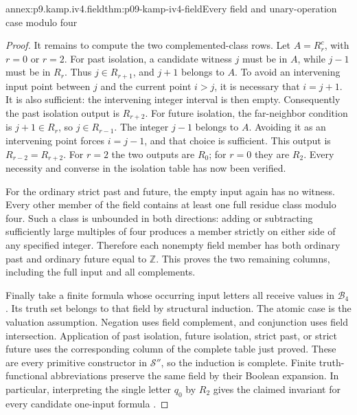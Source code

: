 \begin{annexitem}{annex:p9.kamp.iv4.field}{thm:p09-kamp-iv4-field}{Every field and unary-operation case modulo four}
\begin{proof}
It remains to compute the two complemented-class rows.
Let \(A=R_r^c\), with \(r=0\) or \(r=2\).
For past isolation, a candidate witness \(j\) must be
in \(A\), while \(j-1\) must be in \(R_r\).
Thus \(j\in R_{r+1}\), and \(j+1\) belongs to
\(A\). To avoid an intervening input point between
\(j\) and the current point \(i>j\), it is necessary
that \(i=j+1\). It is also sufficient: the intervening
integer interval is then empty. Consequently the past
isolation output is \(R_{r+2}\). For future isolation,
the far-neighbor condition is \(j+1\in R_r\), so
\(j\in R_{r-1}\). The integer \(j-1\) belongs
to \(A\). Avoiding it as an intervening point forces
\(i=j-1\), and that choice is sufficient. This output
is \(R_{r-2}=R_{r+2}\). For \(r=2\) the two
outputs are \(R_0\); for \(r=0\) they are
\(R_2\). Every necessity and converse in the isolation
table has now been verified.

For the ordinary strict past and future, the empty input
again has no witness. Every other member of the field
contains at least one full residue class modulo four.
Such a class is unbounded in both directions: adding or
subtracting sufficiently large multiples of four produces
a member strictly on either side of any specified integer.
Therefore each nonempty field member has both ordinary
past and ordinary future equal to \(\mathbb Z\).
This proves the two remaining columns, including the full
input and all complements.

Finally take a finite formula whose occurring input letters
all receive values in \(\mathcal B_4\). Its truth set
belongs to that field by structural induction. The atomic
case is the valuation assumption. Negation uses field
complement, and conjunction uses field intersection.
Application of past isolation, future isolation, strict
past, or strict future uses the corresponding column of
the complete table just proved. These are every primitive
constructor in \(\mathcal S''\), so the induction is
complete. Finite truth-functional abbreviations preserve
the same field by their Boolean expansion. In particular,
interpreting the single letter \(q_0\) by \(R_2\)
gives the claimed invariant for every candidate one-input
formula
\cite[ch.~IV, thm.~4 proof, pp.~108--109]{Kamp1968}.
\end{proof}
\end{annexitem}

